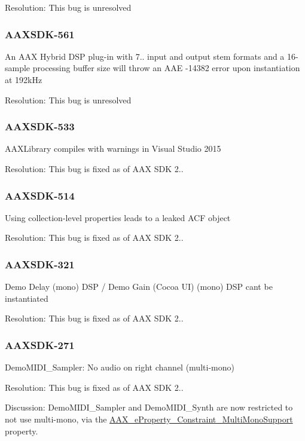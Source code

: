 Resolution\+: This bug is unresolved\hypertarget{a00846_AAXSDK-561}{}\subsubsection{A\+A\+X\+S\+D\+K-\/561}\label{a00846_AAXSDK-561}
An A\+AX Hybrid D\+SP plug-\/in with 7.. input and output stem formats and a 16-\/sample processing buffer size will throw an A\+AE -\/14382 error upon instantiation at 192k\+Hz

Resolution\+: This bug is unresolved\hypertarget{a00846_AAXSDK-533}{}\subsubsection{A\+A\+X\+S\+D\+K-\/533}\label{a00846_AAXSDK-533}
A\+A\+X\+Library compiles with warnings in Visual Studio 2015

Resolution\+: This bug is fixed as of A\+AX S\+DK 2..\hypertarget{a00846_AAXSDK-514}{}\subsubsection{A\+A\+X\+S\+D\+K-\/514}\label{a00846_AAXSDK-514}
Using collection-\/level properties leads to a leaked A\+CF object

Resolution\+: This bug is fixed as of A\+AX S\+DK 2..\hypertarget{a00846_AAXSDK-321}{}\subsubsection{A\+A\+X\+S\+D\+K-\/321}\label{a00846_AAXSDK-321}
Demo Delay (mono) D\+SP / Demo Gain (Cocoa UI) (mono) D\+SP can\textquotesingle{}t be instantiated

Resolution\+: This bug is fixed as of A\+AX S\+DK 2..\hypertarget{a00846_AAXSDK-271}{}\subsubsection{A\+A\+X\+S\+D\+K-\/271}\label{a00846_AAXSDK-271}
Demo\+M\+I\+D\+I\+\_\+\+Sampler\+: No audio on right channel (multi-\/mono)

Resolution\+: This bug is fixed as of A\+AX S\+DK 2..

Discussion\+: Demo\+M\+I\+D\+I\+\_\+\+Sampler and Demo\+M\+I\+D\+I\+\_\+\+Synth are now restricted to not use multi-\/mono, via the \mbox{\hyperlink{a00662_a13e384f22825afd3db6d68395b79ce0da83f671685958bdc668ef574d5a2d92b0}{A\+A\+X\+\_\+e\+Property\+\_\+\+Constraint\+\_\+\+Multi\+Mono\+Support}} property.

